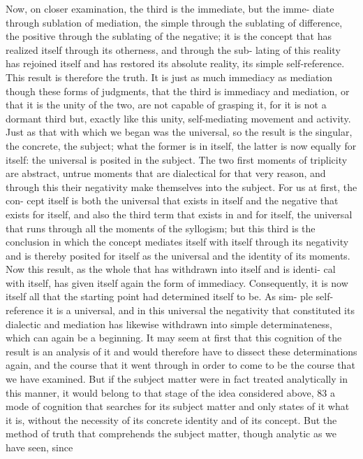 Now, on closer examination, the third is the immediate, but the imme-
diate through sublation of mediation, the simple through the sublating of
difference, the positive through the sublating of the negative; it is the
concept that has realized itself through its otherness, and through the sub-
lating of this reality has rejoined itself and has restored its absolute reality,
its simple self-reference. This result is therefore the truth. It is just as much
immediacy as mediation
 though these forms of judgments, that the third
is immediacy and mediation, or that it is the unity of the two, are not
capable of grasping it, for it is not a dormant third but, exactly like this
unity, self-mediating movement and activity.
 Just as that with which we
began was the universal, so the result is the singular, the concrete, the subject;
what the former is in itself, the latter is now equally for itself: the universal
is posited in the subject. The two first moments of triplicity are abstract,
untrue moments that are dialectical for that very reason, and through this
their negativity make themselves into the subject. For us at first, the con-
cept itself is both the universal that exists in itself and the negative that
exists for itself, and also the third term that exists in and for itself, the
universal that runs through all the moments of the syllogism; but this third
is the conclusion in which the concept mediates itself with itself through
its negativity and is thereby posited for itself as the universal and the identity
of its moments.
Now this result, as the whole that has withdrawn into itself and is identi-
cal with itself, has given itself again the form of immediacy. Consequently,
it is now itself all that the starting point had determined itself to be. As sim-
ple self-reference it is a universal, and in this universal the negativity that
constituted its dialectic and mediation has likewise withdrawn into simple
determinateness, which can again be a beginning. It may seem at first that
this cognition of the result is an analysis of it and would therefore have to
dissect these determinations again, and the course that it went through in
order to come to be
 the course that we have examined. But if the subject
matter were in fact treated analytically in this manner, it would belong to
that stage of the idea considered above, 83 a mode of cognition that searches
for its subject matter and only states of it what it is, without the necessity
of its concrete identity and of its concept. But the method of truth that
comprehends the subject matter, though analytic as we have seen, since
